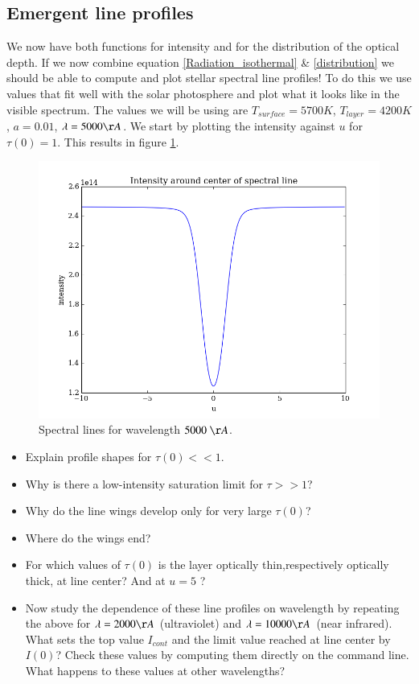\documentclass{aa}   %
\begin{document}
\subsection{Emergent line profiles}
We now have both functions for intensity and for the distribution of the optical depth. If we now combine equation \ref{Radiation_isothermal} \& \ref{distribution} we should be able to compute and plot stellar spectral line profiles!
To do this we use values that fit well with the solar photosphere and plot what it looks like in the visible spectrum.
The values we will be using are $T_{surface} = 5700 K$, $T_{layer} = 4200 K$, $a = 0.01$, $\lambda = 5000 \AA$.
We start by plotting the intensity against $u$ for $\tau(0) = 1$. This results in figure \ref{emergent_line_orig_5000}.
\begin{figure}
 \includegraphics[width=.49\textwidth]{emergent_line_orig_5000.png}
 \caption{Spectral lines for wavelength $5000 ~\AA$.}
 \label{emergent_line_orig_5000}
\end{figure}

\begin{itemize}
 \item 
 Explain profile shapes for $\tau(0) << 1$.
 \item 
 Why is there a low-intensity saturation limit for $\tau >> 1$?
 \item 
 Why do the line wings develop only for very large $\tau(0)$?
 \item 
 Where do the wings end?
 \item 
 For which values of $\tau(0)$ is the layer optically thin,respectively optically thick, at line center?
 And at $u = 5$ ?
 \item
 Now study the dependence of these line profiles on wavelength by repeating the above for $\lambda = 2000 \AA$ (ultraviolet) and $\lambda = 10000 \AA$ (near infrared). What sets the top value $I_{cont}$ and the limit value reached at line center 	by $I(0)$? Check these values by computing them directly on the command line. What happens to these values at other wavelengths?
\end{itemize}
\end{document}
